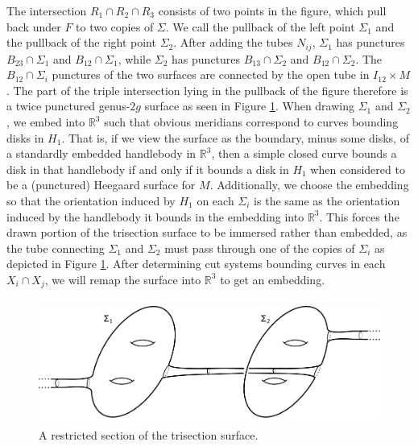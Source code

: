 \documentclass[12pt]{amsart}
\newcommand{\R}{\mathbb{R}}
\theoremstyle{definition}
\theoremstyle{remark}
\begin{document}
The intersection $R_1 \cap R_2 \cap R_3$ consists of two points in the figure, which pull back under $F$ to two copies of $\Sigma$.
We call the pullback of the left point $\Sigma_1$ and the pullback of the right point $\Sigma_2$.
After adding the tubes $N_{ij}$, $\Sigma_1$ has punctures $B_{23} \cap \Sigma_1$ and $B_{12} \cap \Sigma_1$, while $\Sigma_2$ has punctures $B_{13} \cap \Sigma_2$ and $B_{12} \cap \Sigma_2$.
The $B_{12} \cap \Sigma_i$ punctures of the two surfaces are connected by the open tube in $I_{12} \times M$.
 The part of the triple intersection lying in the pullback of the figure therefore is a twice punctured genus-$2g$ surface as seen in Figure \ref{fig_coresubsurface}.
When drawing $\Sigma_1$ and $\Sigma_2$, we embed into $\R^3$ such that obvious meridians correspond to curves bounding disks in $H_1$.
That is, if we view the surface as the boundary, minus some disks, of a standardly embedded handlebody in $\R^3$, then a simple closed curve bounds a disk in that handlebody if and only if it bounds a disk in $H_1$ when considered to be a (punctured) Heegaard surface for $M$.
Additionally, we choose the embedding so that the orientation induced by $H_1$ on each $\Sigma_i$ is the same as the orientation induced by the handlebody it bounds in the embedding into $\R^3$.
This forces the drawn portion of the trisection surface to be immersed rather than embedded, as the tube connecting $\Sigma_1$ and $\Sigma_2$ must pass through one of the copies of $\Sigma_i$ as depicted in Figure \ref{fig_coresubsurface}.
After determining cut systems bounding curves in each $X_i \cap X_j$, we will remap the surface into $\R^3$ to get an embedding.

\begin{figure}[h]
\centering
\includegraphics[height=1.6in]{coresubsurface.png}
\caption{A restricted section of the trisection surface.}
\label{fig_coresubsurface}
\end{figure}
\end{document}
